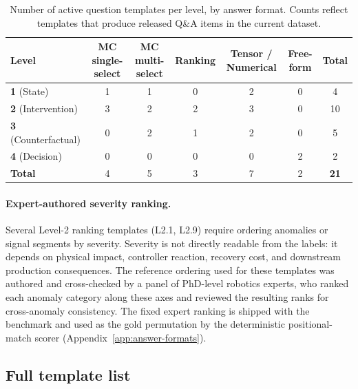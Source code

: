 \documentclass{article}
\begin{document}
\begin{table}[htbp]
    \centering
    \caption{Number of active question templates per level, by answer format. Counts reflect templates that produce released Q\&A items in the current dataset.}
    \label{tab:template_inventory}
    \small
    \begin{tabular}{@{}lcccccc@{}}
        \toprule
        Level                       & MC single-select & MC multi-select & Ranking & Tensor / Numerical & Free-form & Total       \\
        \midrule
        \textbf{1} (State)          & 1                & 1               & 0       & 2                  & 0         & 4           \\
        \textbf{2} (Intervention)   & 3                & 2               & 2       & 3                  & 0         & 10          \\
        \textbf{3} (Counterfactual) & 0                & 2               & 1       & 2                  & 0         & 5           \\
        \textbf{4} (Decision)       & 0                & 0               & 0       & 0                  & 2         & 2           \\
        \midrule
        \textbf{Total}              & 4                & 5               & 3       & 7                  & 2         & \textbf{21} \\
        \bottomrule
    \end{tabular}
\end{table}



\paragraph{Expert-authored severity ranking.}
Several Level-2 ranking templates (L2.1, L2.9) require ordering anomalies or signal segments by severity. Severity is not directly readable from the labels: it depends on physical impact, controller reaction, recovery cost, and downstream production consequences. The reference ordering used for these templates was authored and cross-checked by a panel of PhD-level robotics experts, who ranked each anomaly category along these axes and reviewed the resulting ranks for cross-anomaly consistency. The fixed expert ranking is shipped with the benchmark and used as the gold permutation by the deterministic positional-match scorer (Appendix~\ref{app:answer-formats}).

\subsection{Full template list}
\label{app:template_list}
\end{document}
